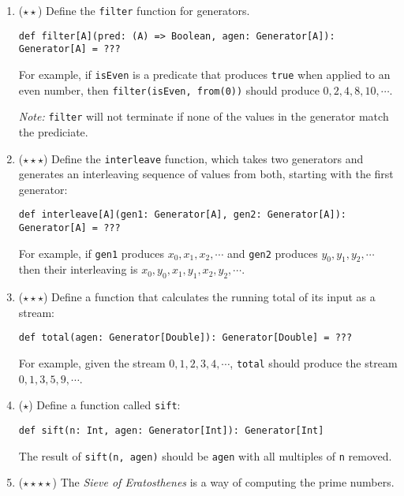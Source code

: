 \documentclass[9pt]{extbook}
\begin{document}
\begin{enumerate}
\item ($\star\star$) Define the \lstinline|filter| function for generators.
\begin{lstlisting}
def filter[A](pred: (A) => Boolean, agen: Generator[A]): Generator[A] = ???
\end{lstlisting}

  For example, if \lstinline|isEven| is a predicate that produces 
  \lstinline|true| when applied to an even number, then
  \lstinline|filter(isEven, from(0))| should produce $0, 2, 4, 8, 10, \cdots$.

  \emph{Note:} \lstinline|filter| will not terminate if none of the values in
  the generator match the prediciate.

  \item ($\star\star\star$)
  Define the \lstinline|interleave| function, which takes two generators
  and generates an interleaving sequence of values from both, starting with
  the first generator:

\begin{lstlisting}
def interleave[A](gen1: Generator[A], gen2: Generator[A]): Generator[A] = ???
\end{lstlisting}

  For example, if \lstinline|gen1| produces $x_0, x_1, x_2, \cdots$ and \lstinline|gen2|
  produces $y_0, y_1, y_2, \cdots$ then their interleaving is $x_0, y_0, x_1, y_1, x_2, y_2, \cdots$.


  \item ($\star\star\star$) Define a function that calculates the running total
  of its input as a stream:
  
\begin{lstlisting}
def total(agen: Generator[Double]): Generator[Double] = ???
\end{lstlisting}

  For example, given the stream $0, 1, 2, 3, 4, \cdots$, \lstinline|total| should
  produce the stream $0, 1, 3, 5, 9, \cdots$.
  
\item ($\star$) Define a function called \lstinline|sift|:

\begin{lstlisting}
def sift(n: Int, agen: Generator[Int]): Generator[Int]
\end{lstlisting}

The result of \lstinline|sift(n, agen)| should be \lstinline|agen| with all multiples of \lstinline|n| removed.


\item ($\star\star\star\star$) The \emph{Sieve of Eratosthenes} is a way of computing the prime numbers.


\end{enumerate}
\end{document}
